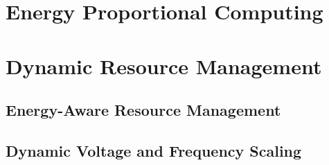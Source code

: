 \section{Energy Proportional Computing}
\label{sec:energy_proportional_computing}

\section{Dynamic Resource Management}
\label{sec:dynamic_resource_management}

\subsection{Energy-Aware Resource Management}
\label{sec:energy-aware_resource_management}

\subsection{Dynamic Voltage and Frequency Scaling}
\label{sec:dynamic_voltage_and_frequency_scaling}
